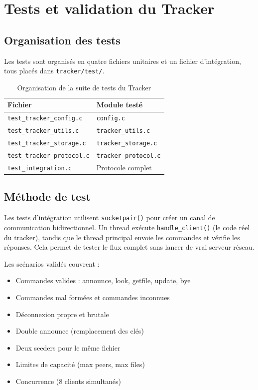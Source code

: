\documentclass[11pt, a4paper]{article}
\begin{document}
\section{Tests et validation du Tracker}

\subsection{Organisation des tests}

Les tests sont organisés en quatre fichiers unitaires et un fichier
d'intégration, tous placés dans \texttt{tracker/test/}.

\begin{table}[H]
\centering
\begin{tabular}{ll}
\toprule
\textbf{Fichier} & \textbf{Module testé} \\
\midrule
\texttt{test\_tracker\_config.c}   & \texttt{config.c} \\
\texttt{test\_tracker\_utils.c}    & \texttt{tracker\_utils.c} \\
\texttt{test\_tracker\_storage.c}  & \texttt{tracker\_storage.c} \\
\texttt{test\_tracker\_protocol.c} & \texttt{tracker\_protocol.c} \\
\texttt{test\_integration.c}       & Protocole complet \\
\bottomrule
\end{tabular}
\caption{Organisation de la suite de tests du Tracker}
\end{table}

\subsection{Méthode de test}

Les tests d'intégration utilisent \texttt{socketpair()} pour créer un canal
de communication bidirectionnel. Un thread exécute \texttt{handle\_client()}
(le code réel du tracker), tandis que le thread principal envoie les
commandes et vérifie les réponses. Cela permet de tester le flux complet
sans lancer de vrai serveur réseau.

Les scénarios validés couvrent :
\begin{itemize}[nosep]
    \item Commandes valides : announce, look, getfile, update, bye
    \item Commandes mal formées et commandes inconnues
    \item Déconnexion propre et brutale
    \item Double announce (remplacement des clés)
    \item Deux seeders pour le même fichier
    \item Limites de capacité (max peers, max files)
    \item Concurrence (8 clients simultanés)
\end{itemize}
\end{document}
